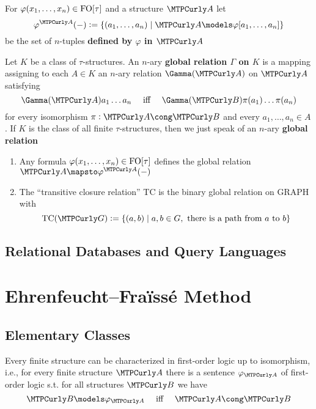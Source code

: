 \documentclass[11pt]{article}
\begin{document}
For \(\varphi(x_1,\dots,x_n)\in\operatorname{FO}[\tau]\) and a structure \(\cala\) let
\begin{equation*}
\varphi^{\cala}(-):=\{(a_1,\dots,a_n)\mid\cala\models\varphi[a_1,\dots,a_n]\}
\end{equation*}
be the set of \(n\)-tuples \textbf{defined by \(\varphi\) in \(\cala\)}

\begin{definition}[]
Let \(K\) be a class of \(\tau\)-structures. An \(n\)-ary
\textbf{global relation
\(\Gamma\) on \(K\)} is a mapping assigning to each \(A\in K\) an \(n\)-ary
relation \(\Gamma(\cala)\) on \(\cala\) satisfying
\begin{equation*}
\Gamma(\cala)a_1\dots a_n\quad\text{ iff }\quad\Gamma(\calb)\pi(a_1)\dots\pi(a_n)
\end{equation*}
for every isomorphism \(\pi:\cala\cong\calb\) and every
\(a_1,\dots,a_n\in A\). If \(K\) is the class of all finite \(\tau\)-structures,
then we just speak of an \(n\)-ary \textbf{global relation}
\end{definition}

\begin{examplle}[]
\begin{enumerate}
\item Any formula \(\varphi(x_1,\dots,x_n)\in\operatorname{FO}[\tau]\) defines the global
relation
\(\cala\mapsto\varphi^{\cala}(-)\)
\item The ``transitive closure relation'' TC is the binary global relation on
GRAPH with
\begin{equation*}
\TC(\calg):=\{(a,b)\mid a,b\in G,\text{ there is a path from $a$ to $b$}\}
\end{equation*}
\end{enumerate}
\end{examplle}

\subsection{Relational Databases and Query Languages}
\label{sec:orga927361}

\section{Ehrenfeucht–Fraïssé Method}
\label{sec:orgf607dd6}

\subsection{Elementary Classes}
\label{sec:org2f5b5be}
\begin{proposition}[]
Every finite structure can be characterized in first-order logic up to
isomorphism, i.e., for every finite structure \(\cala\) there is a sentence
\(\varphi_\cala\) of first-order logic s.t. for all structures \(\calb\) we
have
\begin{equation*}
\calb\models\varphi_{\cala}\quad\text{ iff }\quad\cala\cong\calb
\end{equation*}
\end{proposition}
\end{document}
